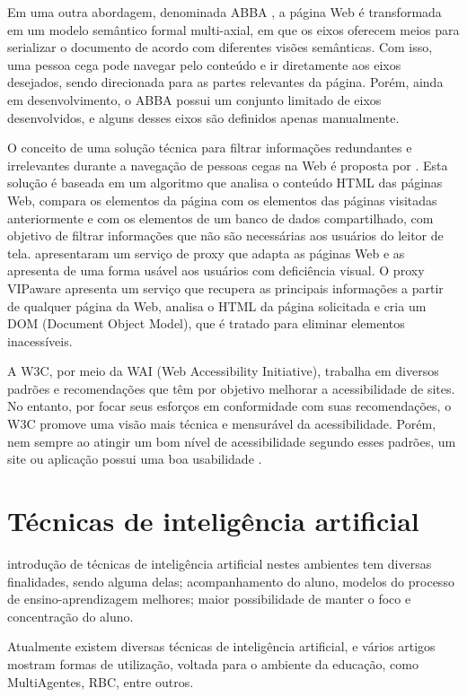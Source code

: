 \documentclass[12pt,journal,compsoc]{IEEEtran}
\begin{document}
Em uma outra abordagem, denominada ABBA \cite{Fayzrakhmanov2010}, a página Web é transformada 
em um modelo semântico formal multi-axial, em que os eixos oferecem meios para serializar o 
documento de acordo com diferentes visões semânticas. Com isso, uma pessoa cega pode navegar 
pelo conteúdo e ir diretamente aos eixos desejados, sendo direcionada para as partes relevantes 
da página. Porém, ainda em desenvolvimento, o ABBA possui um conjunto limitado de eixos desenvolvidos, 
e alguns desses eixos são definidos apenas manualmente.

O conceito de uma solução técnica para filtrar informações redundantes e irrelevantes durante a navegação 
de pessoas cegas na Web é proposta por \cite{Steiner2015}. Esta solução é baseada em um 
algoritmo que analisa o conteúdo HTML das páginas Web, compara os elementos da página com os elementos das 
páginas visitadas anteriormente e com os elementos de um banco de dados compartilhado, com objetivo 
de filtrar informações que não são necessárias aos usuários do leitor de tela. 
\cite{Authors2016} apresentaram um serviço de proxy que adapta as páginas Web e as apresenta de uma 
forma usável aos usuários com deficiência visual. O proxy VIPaware apresenta um serviço que recupera as 
principais informações a partir de qualquer página da Web, analisa o HTML da página solicitada e cria 
um DOM (Document Object Model), que é tratado para eliminar elementos inacessíveis.

A W3C, por meio da WAI (Web Accessibility Initiative), trabalha em diversos padrões
e recomendações que têm por objetivo melhorar a acessibilidade de sites. No entanto,
por focar seus esforços em conformidade com suas recomendações, o W3C promove uma
visão mais técnica e mensurável da acessibilidade. Porém, nem sempre ao atingir um
bom nível de acessibilidade segundo esses padrões, um site ou aplicação possui uma boa
usabilidade \cite{Petrie2007}.

\section{Técnicas de inteligência artificial}
 introdução de técnicas de inteligência artificial nestes ambientes tem diversas finalidades, 
sendo alguma delas;  acompanhamento do aluno, modelos do processo de ensino-aprendizagem melhores; maior 
possibilidade de manter o foco e concentração do aluno.

Atualmente existem diversas técnicas de inteligência artificial, e vários artigos mostram formas de utilização, 
voltada para o ambiente da educação, como MultiAgentes, RBC, entre outros.
\end{document}
